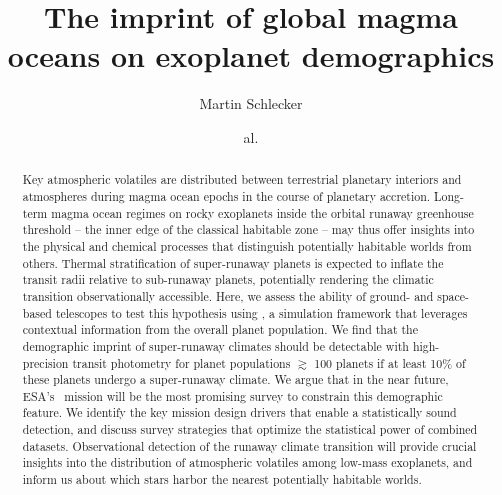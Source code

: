 \documentclass[twocolumn,twocolappendix]{aastex631}
\begin{document}
\title{The imprint of global magma oceans on exoplanet demographics}

\author[0000-0001-8355-2107]{Martin Schlecker}
\author{al.}

\begin{abstract}
Key atmospheric volatiles are distributed between terrestrial planetary interiors and atmospheres during magma ocean epochs in the course of planetary accretion.
Long-term magma ocean regimes on rocky exoplanets inside the orbital runaway greenhouse threshold -- the inner edge of the classical habitable zone -- may thus offer insights into the physical and chemical processes that distinguish potentially habitable worlds from others.
Thermal stratification of super-runaway planets is expected to inflate the transit radii relative to sub-runaway planets, potentially rendering the climatic transition observationally accessible.
Here, we assess the ability of ground- and space-based telescopes to test this hypothesis using \bioverse, a simulation framework that leverages contextual information from the overall planet population.
We find that the demographic imprint of super-runaway climates should be detectable with high-precision transit photometry for planet populations $\gtrsim$ 100 planets if at least 10\% of these planets undergo a super-runaway climate.
We argue that in the near future, ESA's \plato\ mission will be the most promising survey to constrain this demographic feature.
We identify the key mission design drivers that enable a statistically sound detection, and discuss survey strategies that optimize the statistical power of combined datasets.
Observational detection of the runaway climate transition will provide crucial insights into the distribution of atmospheric volatiles among low-mass exoplanets, and inform us about which stars harbor the nearest potentially habitable worlds.
\end{abstract}

\end{document}
